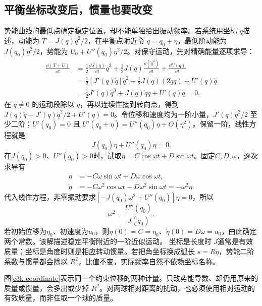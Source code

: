 \subsection{平衡坐标改变后，惯量也要改变}
势能曲线的最低点确定稳定位置，却不能单独给出振动频率。若系统用坐标 $q$描述，动能为 $T=J(q)\dot q^2/2$，在平衡点附近令 $q=q_0+\eta$，最低阶动能为 $J(q_0)\dot\eta^2/2$，势能为 $U_0+U''(q_0)\eta^2/2$。对保守运动，先对精确能量逐项求导：
\begin{align*}
\frac{\dd(T+U)}{\dd t}
&=\frac12\frac{\dd J(q)}{\dd t}\dot q^2
  +\frac12J(q)\frac{\dd(\dot q^2)}{\dd t}
  +\frac{\dd U(q)}{\dd t}\\
&=\frac12[J'(q)\dot q]\dot q^2
  +\frac12J(q)(2\dot q\ddot q)+U'(q)\dot q\\
&=\frac12J'(q)\dot q^3+J(q)\dot q\ddot q+U'(q)\dot q=0.
\end{align*}
在 $\dot q\ne0$ 的运动段除以 $\dot q$，再以连续性接到转向点，得到 $J(q)\ddot q+J'(q)\dot q^2/2+U'(q)=0$。令位移和速度均为一阶小量，$J'(q)\dot q^2/2$ 至少二阶；$U'(q_0)=0$ 且 $U'(q_0+\eta)=U''(q_0)\eta+O(\eta^2)$。保留一阶，线性方程就是
\[J(q_0)\ddot\eta+U''(q_0)\eta=0.\]
在$J(q_0)>0$、$U''(q_0)>0$时，试取$\eta=C\cos\omega t+D\sin\omega t$。固定$C,D,\omega$，逐次求导有
\begin{align*}
\dot\eta&=-C\omega\sin\omega t+D\omega\cos\omega t,\\
\ddot\eta&=-C\omega^2\cos\omega t-D\omega^2\sin\omega t=-\omega^2\eta.
\end{align*}
代入线性方程，非零振动要求$[-J(q_0)\omega^2+U''(q_0)]\eta=0$，所以
\[
\omega^2=\frac{U''(q_0)}{J(q_0)}.
\]
若初始位移为$\eta_0$、初速度为$u_0$，则$\eta(0)=C=\eta_0$、$\dot\eta(0)=D\omega=u_0$，由此确定两个常数。该解描述稳定平衡附近的一阶近似运动。
坐标是长度时 $J$通常是有效质量；坐标是角度时则是相应转动惯量。若把角坐标换成弧长 $s=R\eta$，势能二阶系数与惯量都会除以 $R^2$，比值不变，实际频率自然不依赖坐标名称。

图\ref{c3k-coordinate}表示同一个约束位移的两种计量。只改势能导数、却仍用原来的质量或惯量，会多出或少掉 $R^2$。对两球相对距离的扰动，也必须使用相对运动的有效质量，而非任取一个球的质量。



